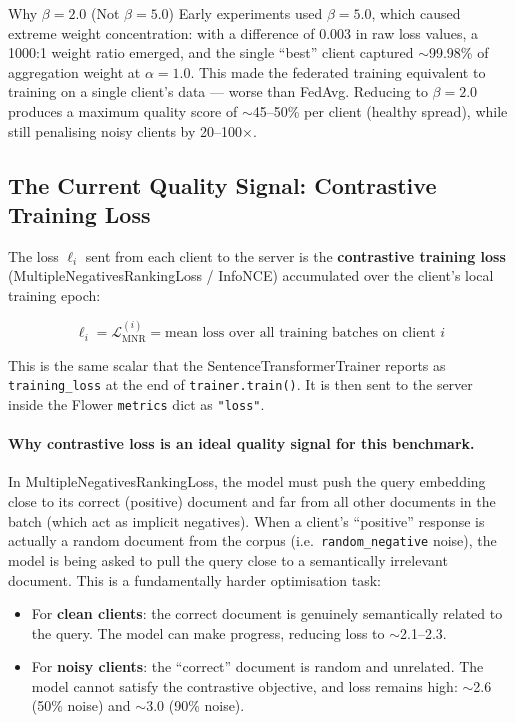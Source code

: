 \documentclass[12pt,a4paper]{article}
\begin{document}
\begin{keybox}{Why $\beta = 2.0$ (Not $\beta = 5.0$)}
  Early experiments used $\beta = 5.0$, which caused extreme weight concentration: with a difference of 0.003 in raw loss values, a 1000:1 weight ratio emerged, and the single ``best'' client captured $\sim$99.98\% of aggregation weight at $\alpha=1.0$. This made the federated training equivalent to training on a single client's data --- worse than FedAvg. Reducing to $\beta = 2.0$ produces a maximum quality score of $\sim$45--50\% per client (healthy spread), while still penalising noisy clients by 20--100$\times$.
\end{keybox}

\subsection{The Current Quality Signal: Contrastive Training Loss}

The loss $\ell_i$ sent from each client to the server is the \textbf{contrastive training loss} (MultipleNegativesRankingLoss / InfoNCE) accumulated over the client's local training epoch:

\begin{equation}
  \ell_i = \mathcal{L}_{\text{MNR}}^{(i)} = \text{mean loss over all training batches on client } i
  \label{eq:train_loss_signal}
\end{equation}

This is the same scalar that the SentenceTransformerTrainer reports as \texttt{training\_loss} at the end of \texttt{trainer.train()}. It is then sent to the server inside the Flower \texttt{metrics} dict as \texttt{"loss"}.

\paragraph{Why contrastive loss is an ideal quality signal for this benchmark.}

In MultipleNegativesRankingLoss, the model must push the query embedding close to its correct (positive) document and far from all other documents in the batch (which act as implicit negatives). When a client's ``positive'' response is actually a random document from the corpus (i.e.\ \texttt{random\_negative} noise), the model is being asked to pull the query close to a semantically irrelevant document. This is a fundamentally harder optimisation task:
\begin{itemize}
  \item For \textbf{clean clients}: the correct document is genuinely semantically related to the query. The model can make progress, reducing loss to $\sim$2.1--2.3.
  \item For \textbf{noisy clients}: the ``correct'' document is random and unrelated. The model cannot satisfy the contrastive objective, and loss remains high: $\sim$2.6 (50\% noise) and $\sim$3.0 (90\% noise).
\end{itemize}
\end{document}

